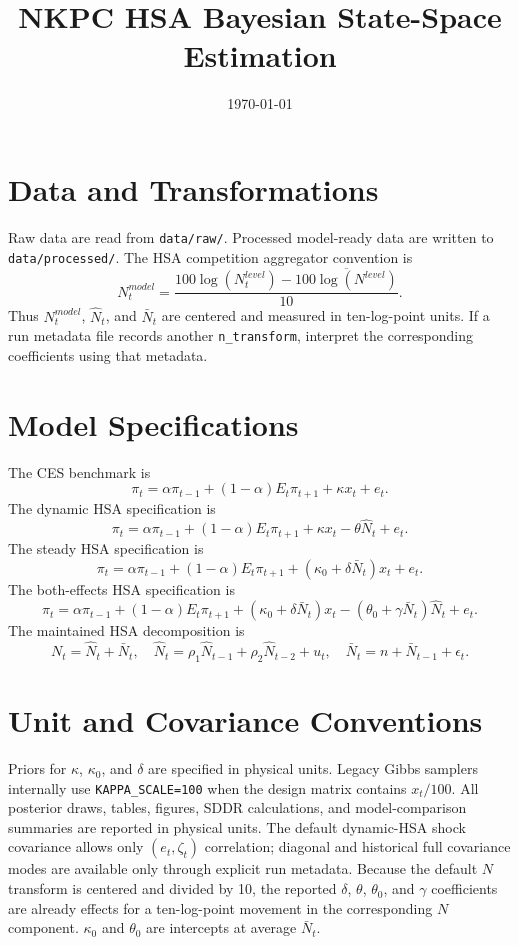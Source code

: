 \documentclass[11pt]{article}
\title{NKPC HSA Bayesian State-Space Estimation}
\author{}
\date{\today}
\begin{document}
\maketitle

\section{Data and Transformations}
Raw data are read from \texttt{data/raw/}. Processed model-ready data are written to
\texttt{data/processed/}. The HSA competition aggregator convention is
\[
N^{model}_t=\frac{100\log(N^{level}_t)-\overline{100\log(N^{level})}}{10}.
\]
Thus \(N^{model}_t\), \(\hat N_t\), and \(\bar N_t\) are centered and measured
in ten-log-point units. If a run metadata file records another
\texttt{n\_transform}, interpret the corresponding coefficients using that
metadata.

\section{Model Specifications}
The CES benchmark is
\[
\pi_t=\alpha \pi_{t-1}+(1-\alpha)E_t\pi_{t+1}+\kappa x_t+e_t.
\]
The dynamic HSA specification is
\[
\pi_t=\alpha \pi_{t-1}+(1-\alpha)E_t\pi_{t+1}+\kappa x_t-\theta\hat N_t+e_t.
\]
The steady HSA specification is
\[
\pi_t=\alpha \pi_{t-1}+(1-\alpha)E_t\pi_{t+1}+(\kappa_0+\delta\bar N_t)x_t+e_t.
\]
The both-effects HSA specification is
\[
\pi_t=\alpha \pi_{t-1}+(1-\alpha)E_t\pi_{t+1}
+(\kappa_0+\delta\bar N_t)x_t-(\theta_0+\gamma\bar N_t)\hat N_t+e_t.
\]
The maintained HSA decomposition is
\[
N_t=\hat N_t+\bar N_t,\quad
\hat N_t=\rho_1\hat N_{t-1}+\rho_2\hat N_{t-2}+u_t,\quad
\bar N_t=n+\bar N_{t-1}+\epsilon_t.
\]

\section{Unit and Covariance Conventions}
Priors for \(\kappa\), \(\kappa_0\), and \(\delta\) are specified in
physical units. Legacy Gibbs samplers internally use \texttt{KAPPA\_SCALE=100}
when the design matrix contains \(x_t/100\). All posterior draws, tables,
figures, SDDR calculations, and model-comparison summaries are reported in
physical units. The default dynamic-HSA shock covariance allows only
\((e_t,\zeta_t)\) correlation; diagonal and historical full covariance modes
are available only through explicit run metadata.
Because the default \(N\) transform is centered and divided by 10, the reported
\(\delta\), \(\theta\), \(\theta_0\), and \(\gamma\) coefficients are already
effects for a ten-log-point movement in the corresponding \(N\) component.
\(\kappa_0\) and \(\theta_0\) are intercepts at average \(\bar N_t\).
\end{document}
